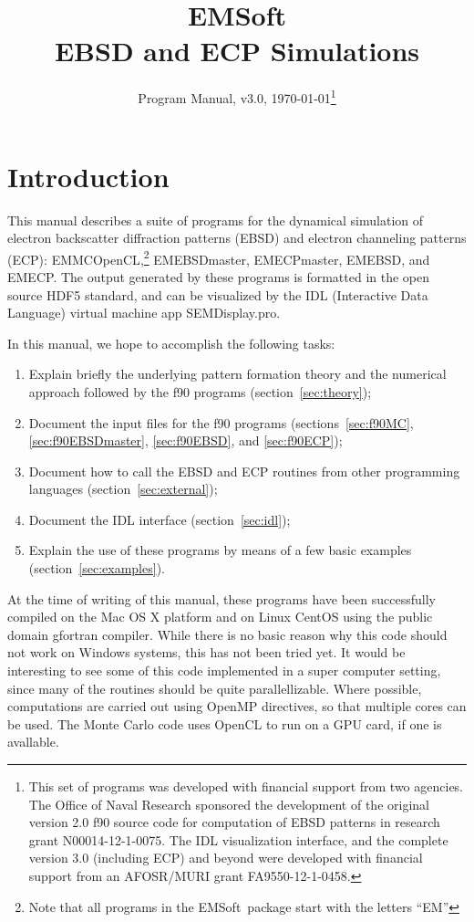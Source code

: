 \documentclass[DIV=calc, paper=letter, fontsize=11pt]{scrartcl}	 %
\title{EMSoft\\ EBSD and ECP Simulations} %
\author{\vspace*{-0.7in}} %
\date{Program Manual, v3.0, \today\protect\footnote{This set of programs was developed with financial support from two agencies. 
The Office of Naval Research sponsored the development of the original version 2.0 f90 source code for computation of EBSD patterns in research 
grant N00014-12-1-0075.  The IDL visualization interface, and the complete version 3.0 (including ECP) and beyond were developed with financial 
support from an AFOSR/MURI grant FA9550-12-1-0458.}}
\newcommand{\ctp}{\textsf{EMSoft}}
\begin{document}
\maketitle

\vspace*{-0.5in}\begin{figure}[h]
\leavevmode\centering
\end{figure}

\renewcommand{\contentsname}{Table of Contents}
{\vspace*{-0.1in}\footnotesize\tableofcontents}

\newpage
\section{Introduction}
This manual describes a suite of programs for the dynamical simulation of electron backscatter diffraction patterns (EBSD) and electron channeling patterns (ECP):
\textsf{EMMCOpenCL},\footnote{Note that all programs in the \ctp\ package start with the letters ``EM''} \textsf{EMEBSDmaster}, \textsf{EMECPmaster}, \textsf{EMEBSD},
and \textsf{EMECP}.  The output generated by these programs is formatted in the open source HDF5 standard, and
can be visualized by the IDL (Interactive Data Language) virtual machine app \textsf{SEMDisplay.pro}.  

In this manual, we hope to accomplish the following tasks:
\begin{enumerate}
	\item Explain briefly the underlying pattern formation theory and the numerical approach followed by the f90 programs (section~\ref{sec:theory});
	\item Document the input files for the f90 programs (sections~\ref{sec:f90MC}, \ref{sec:f90EBSDmaster}, \ref{sec:f90EBSD}, and \ref{sec:f90ECP});
	\item Document how to call the EBSD and ECP routines from other programming languages (section~\ref{sec:external});
	\item Document the IDL interface (section~\ref{sec:idl});
	\item Explain the use of these programs by means of a few basic examples (section~\ref{sec:examples}).
\end{enumerate}

At the time of writing of this manual, these programs have been successfully compiled on the Mac OS X platform and on Linux CentOS using the public domain gfortran compiler.  
While there is no basic reason why this code should not work on Windows systems, this has not been tried yet.
It would be interesting to see some of this code implemented in a super computer setting, since many of the routines should be quite parallellizable.  Where possible, computations
are carried out using OpenMP directives, so that multiple cores can be used.  The Monte Carlo code uses OpenCL to run on a GPU card, if one is avallable.
\end{document}
